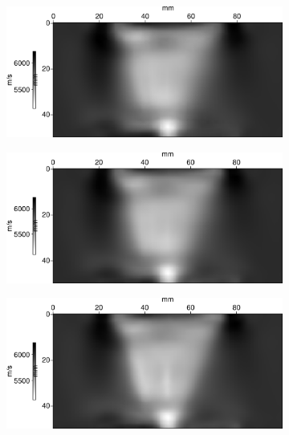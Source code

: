 \documentclass[a4paper,11pt]{report} %
\newenvironment{changemargin}[2]{\begin{list}{}{%
\setlength{\topsep}{0pt}%
\setlength{\leftmargin}{0pt}%
\setlength{\rightmargin}{0pt}%
\setlength{\listparindent}{\parindent}%
\setlength{\itemindent}{\parindent}%
\setlength{\parsep}{0pt plus 1pt}%
\addtolength{\leftmargin}{#1}%
\addtolength{\rightmargin}{#2}%
\setlength{\textwidth}{21cm}
}\item }{\end{list}}
\begin{document}
\begin{figure}[!h]
	\begin{changemargin}{-2cm}{-2cm}
		\begin{subfigure}[b]{0.23\textwidth}
			\includegraphics[width=\textwidth]{img/multi_trans/vp_multi_150k.png}
		\end{subfigure}
		\begin{subfigure}[b]{0.23\textwidth}
			\includegraphics[width=\textwidth]{img/multi_trans/vp_multi_337k.png}
		\end{subfigure}
		\begin{subfigure}[b]{0.23\textwidth}
			\includegraphics[width=\textwidth]{img/multi_trans/vp_multi_750k.png}
		\end{subfigure}

\end{changemargin}
\end{figure}
\end{document}
